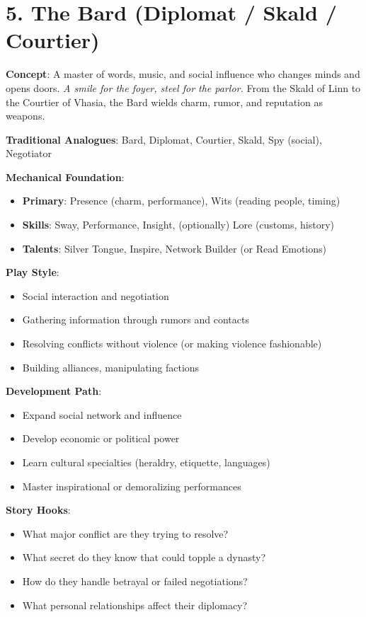 \section{5. The Bard (Diplomat / Skald / Courtier)}
\label{sec:concept-bard}

\textbf{Concept}: A master of words, music, and social influence who changes minds and opens doors. \emph{A smile for the foyer, steel for the parlor.} From the Skald of Linn to the Courtier of Vhasia, the Bard wields charm, rumor, and reputation as weapons.

\textbf{Traditional Analogues}: Bard, Diplomat, Courtier, Skald, Spy (social), Negotiator

\textbf{Mechanical Foundation}:
\begin{itemize}
\item \textbf{Primary}: Presence (charm, performance), Wits (reading people, timing)
\item \textbf{Skills}: Sway, Performance, Insight, (optionally) Lore (customs, history)
\item \textbf{Talents}: Silver Tongue, Inspire, Network Builder (or Read Emotions)
\end{itemize}

\textbf{Play Style}:
\begin{itemize}
\item Social interaction and negotiation
\item Gathering information through rumors and contacts
\item Resolving conflicts without violence (or making violence fashionable)
\item Building alliances, manipulating factions
\end{itemize}

\textbf{Development Path}:
\begin{itemize}
\item Expand social network and influence
\item Develop economic or political power
\item Learn cultural specialties (heraldry, etiquette, languages)
\item Master inspirational or demoralizing performances
\end{itemize}

\textbf{Story Hooks}:
\begin{itemize}
\item What major conflict are they trying to resolve?
\item What secret do they know that could topple a dynasty?
\item How do they handle betrayal or failed negotiations?
\item What personal relationships affect their diplomacy?
\end{itemize}


